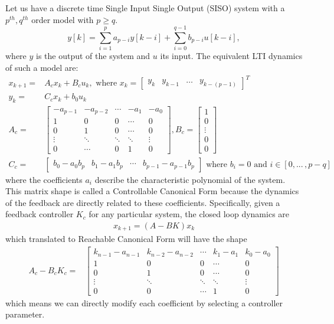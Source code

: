\documentclass[a4paper,UKenglish]{lipics-v2018}
\newcommand{\mat}[1]{{#1}}
\renewcommand{\vec}[1]{{#1}}
\begin{document}
Let us have a discrete time Single Input Single Output (SISO) system with a $p^{th},q^{th}$ order model with $p\geq q$.
$$y[k]=\sum_{i=1}^p a_{p-i}y[k-i]+\sum_{i=0}^{q-1} b_{p-i}u[k-i],$$
where $y$ is the output of the system and $u$ its input.
The equivalent LTI dynamics of such a model are:
\begin{align}
\label{eq:cf_SISO}
\vec{x}_{k+1}=&\mat{A}_c\vec{x}_k+\mat{B}_cu_k, \text{ where } \vec{x}_k=[\begin{array}{cccc}y_k&y_{k-1}&\hdots&y_{k-(p-1)}\end{array}]^T\\
y_k=&\mat{C}_c\vec{x}_k + b_0u_k\nonumber\\
\mat{A}_c=&\left[
\begin{array}{ccccc}
-a_{p-1}&-a_{p-2}&\cdots&-a_1&-a_0\\
1&0&0&\cdots&0\\
0&1&0&\cdots&0\\
\vdots&\ddots&\ddots&\ddots&\vdots\\
0&\cdots&0&1&0
\end{array}\right],
\mat{B}_c=\left[
\begin{array}{c}
1\\0\\ \vdots\\ 0\\ 0
\end{array}\right]\nonumber\\
\mat{C}_c=&[\begin{array}{ccccc}b_0-a_0b_p&b_1-a_1b_p&\cdots&b_{p-1}-a_{p-1}b_p\end{array}] \text{ where } b_i=0 \text{ and } i \in [0, ...\,,p-q]\nonumber
\end{align}
%
where the coefficients $a_i$ describe the characteristic polynomial of the
system.  This matrix shape is called a Controllable Canonical Form because
the dynamics of the feedback are directly related to these coefficients. 
Specifically, given a feedback controller $\mat{K}_c$ for any particular
system, the closed loop dynamics are
%
\begin{align}
\vec{x}_{k+1}=(\mat{A}-\mat{B}\mat{K})\vec{x}_k
\label{eq:closeloopdynamics}
\end{align}
which translated to Reachable Canonical Form will have the shape
\begin{align}
\mat{A}_c-\mat{B}_c\mat{K}_c=&\left[
\begin{array}{ccccc}
k_{n-1}-a_{n-1}&k_{n-2}-a_{n-2}&\cdots&k_1-a_1&k_0-a_0\\
1&0&0&\cdots&0\\
0&1&0&\cdots&0\\
\vdots&\ddots&\ddots&\ddots&\vdots\\
0&0&\cdots&1&0
\end{array}\right]
\label{eq:cf_SISO_fb}
\end{align}
%
which means we can directly modify each coefficient by selecting a
controller parameter.
\end{document}
